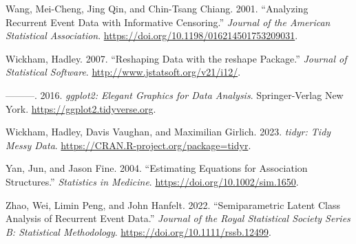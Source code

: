 \begin{CSLReferences}{1}{0}
\leavevmode{}%
Wang, Mei-Cheng, Jing Qin, and Chin-Tsang Chiang. 2001. {``Analyzing Recurrent Event Data with Informative Censoring.''} \emph{Journal of the American Statistical Association}. \url{https://doi.org/10.1198/016214501753209031}.

\leavevmode{}%
Wickham, Hadley. 2007. {``Reshaping Data with the {reshape} Package.''} \emph{Journal of Statistical Software}. \url{http://www.jstatsoft.org/v21/i12/}.

\leavevmode{}%
---------. 2016. \emph{{ggplot2}: Elegant Graphics for Data Analysis}. Springer-Verlag New York. \url{https://ggplot2.tidyverse.org}.

\leavevmode{}%
Wickham, Hadley, Davis Vaughan, and Maximilian Girlich. 2023. \emph{{tidyr}: Tidy Messy Data}. \url{https://CRAN.R-project.org/package=tidyr}.

\leavevmode{}%
Yan, Jun, and Jason Fine. 2004. {``Estimating Equations for Association Structures.''} \emph{Statistics in Medicine}. \url{https://doi.org/10.1002/sim.1650}.

\leavevmode{}%
Zhao, Wei, Limin Peng, and John Hanfelt. 2022. {``Semiparametric Latent Class Analysis of Recurrent Event Data.''} \emph{Journal of the Royal Statistical Society Series B: Statistical Methodology}. \url{https://doi.org/10.1111/rssb.12499}.

\end{CSLReferences}


\address{%
Qi Yu\\
Emory University\\%
Department of Biostatistics and Bioinformatics\\ 1518 Clifton Rd. NE, Atlanta, GA 30322, USA\\
%
%
\textit{ORCiD: \href{https://orcid.org/0009-0007-7585-1183}{0009-0007-7585-1183}}\\%
\href{mailto:qi.yu2@emory.edu}{\nolinkurl{qi.yu2@emory.edu}}%
}

\address{%
Limin Peng\\
Emory University\\%
Department of Biostatistics and Bioinformatics\\ 1518 Clifton Rd. NE, Atlanta, GA 30322, USA\\
%
%
\textit{ORCiD: \href{https://orcid.org/0000-0002-8042-3112}{0000-0002-8042-3112}}\\%
\href{mailto:lpeng@emory.edu}{\nolinkurl{lpeng@emory.edu}}%
}
